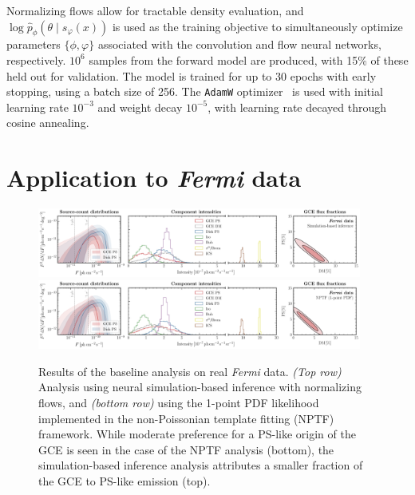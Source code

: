 \documentclass[]{article}
\newcommand{\Fermi}{\emph{Fermi}\xspace}
\begin{document}
Normalizing flows allow for tractable density evaluation, and $\log \hat p_\phi(\theta\mid s_\varphi(x))$ is used as the training objective to simultaneously optimize parameters $\{\phi,\varphi\}$ associated with the convolution and flow neural networks, respectively. $10^6$ samples from the forward model are produced, with 15\% of these held out for validation. The model is trained for up to 30 epochs with early stopping, using a batch size of 256. The \texttt{AdamW} optimizer~\cite{kingma2017adam,loshchilov2019decoupled} is used with initial learning rate $10^{-3}$ and weight decay $10^{-5}$, with learning rate decayed through cosine annealing.

\section{Application to \Fermi data}
\label{sec:experiments}

%
\begin{figure}
\includegraphics[width=0.95\textwidth]{figures/data_fid_sbi.pdf} \\
\includegraphics[width=0.95\textwidth]{figures/data_fid_nptf.pdf}
\caption{Results of the baseline analysis on real \Fermi data. \emph{(Top row)} Analysis using neural simulation-based inference with normalizing flows, and \emph{(bottom row)} using the 1-point PDF likelihood implemented in the non-Poissonian template fitting (NPTF) framework. While moderate preference for a PS-like origin of the GCE is seen in the case of the NPTF analysis (bottom), the simulation-based inference analysis attributes a smaller fraction of the GCE to PS-like emission (top).}
\label{fig:fid_data}
\end{figure}
%
\end{document}
